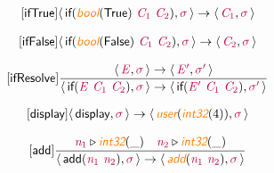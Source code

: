 \documentclass[10pt,leqno,fleqn]{article}
\newcommand{\artVariable}[1]{\mbox{\color{purple}\em #1\/}}
\newcommand{\artConstructor}[1]{\mbox{\sf #1}}
\newcommand{\artSpecial}[1]{\mbox{\color{orange}\sf\em #1}}
\begin{document}
\begin{equation}
\tag*{[\artConstructor{\sf ifTrue}]}
\begin{split}\langle\, \artConstructor{\sf if}(\artSpecial{bool}(\artConstructor{\sf True})\ \artVariable{C$_{1}$}\ \artVariable{C$_{2}$}), \artVariable{$\sigma$}\,\rangle \rightarrow \langle\, \artVariable{C$_{1}$}, \artVariable{$\sigma$}\,\rangle 
\end{split}
\end{equation}

\begin{equation}
\tag*{[\artConstructor{\sf ifFalse}]}
\begin{split}\langle\, \artConstructor{\sf if}(\artSpecial{bool}(\artConstructor{\sf False})\ \artVariable{C$_{1}$}\ \artVariable{C$_{2}$}), \artVariable{$\sigma$}\,\rangle \rightarrow \langle\, \artVariable{C$_{2}$}, \artVariable{$\sigma$}\,\rangle 
\end{split}
\end{equation}

\begin{equation}
\tag*{[\artConstructor{\sf ifResolve}]}
\begin{split}\frac{\langle\, \artVariable{E}, \artVariable{$\sigma$}\,\rangle \rightarrow \langle\, \artVariable{E\/$^\prime$}, \artVariable{$\sigma$\/$^\prime$}\,\rangle }{\langle\, \artConstructor{\sf if}(\artVariable{E}\ \artVariable{C$_{1}$}\ \artVariable{C$_{2}$}), \artVariable{$\sigma$}\,\rangle \rightarrow \langle\, \artConstructor{\sf if}(\artVariable{E\/$^\prime$}\ \artVariable{C$_{1}$}\ \artVariable{C$_{2}$}), \artVariable{$\sigma$\/$^\prime$}\,\rangle }
\end{split}
\end{equation}

\begin{equation}
\tag*{[\artConstructor{\sf display}]}
\begin{split}\langle\, \artConstructor{\sf display}, \artVariable{$\sigma$}\,\rangle \rightarrow \langle\, \artSpecial{user}(\artSpecial{int32}(4)), \artVariable{$\sigma$}\,\rangle 
\end{split}
\end{equation}

\begin{equation}
\tag*{[\artConstructor{\sf add}]}
\begin{split}\frac{ \artVariable{n$_{1}$}\triangleright \artSpecial{int32}(\_) \quad  \artVariable{n$_{2}$}\triangleright \artSpecial{int32}(\_) }{\langle\, \artConstructor{\sf add}(\artVariable{n$_{1}$}\ \artVariable{n$_{2}$}), \artVariable{$\sigma$}\,\rangle \rightarrow \langle\, \artSpecial{add}(\artVariable{n$_{1}$}\ \artVariable{n$_{2}$}), \artVariable{$\sigma$}\,\rangle }
\end{split}
\end{equation}
\end{document}
